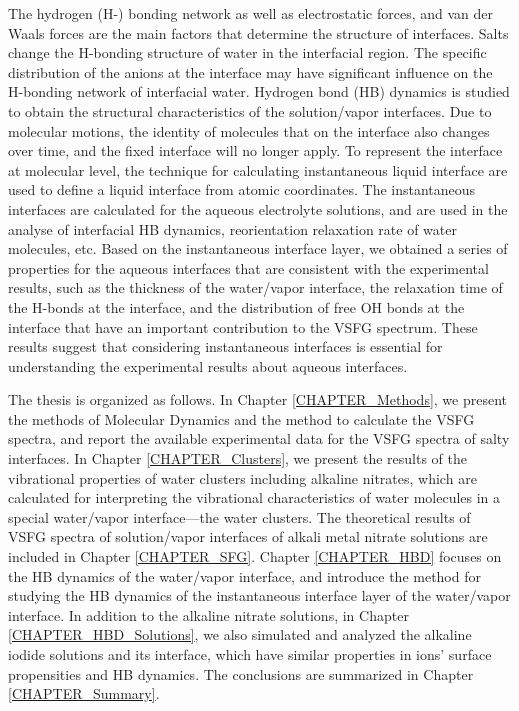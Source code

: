 %
The hydrogen (H-) bonding network \cite{Eisenberg1969,Speedy1976,Poole1994,Soper2008b,Nilsson2011,Ball2001,Pettersson2015} as well as electrostatic forces, 
and van der Waals forces are the main factors that determine the structure of interfaces. 
Salts change the H-bonding structure of water in the interfacial region\cite{EAR04,McLain2006,Ball2008}. 
The specific distribution of the anions at the interface may have significant influence on the H-bonding network of interfacial water\cite{Morita2008}.
Hydrogen bond (HB) dynamics is studied to obtain the structural characteristics of the solution/vapor interfaces.
Due to molecular motions, the identity of molecules that on the interface also changes over time\cite{Willard2010}, and the fixed interface will no longer apply. 
To represent the interface at molecular level, the technique for calculating instantaneous liquid interface are used to define a liquid interface from atomic coordinates.
The instantaneous interfaces are calculated for the aqueous electrolyte solutions, and are used in the analyse of interfacial HB dynamics, 
reorientation relaxation rate of water molecules, etc.
Based on the instantaneous interface layer, we obtained a series of properties for the aqueous interfaces that are consistent with the experimental results, 
such as the thickness of the water/vapor interface, the relaxation time of the H-bonds at the interface, 
and the distribution of free OH bonds at the interface that have an important contribution to the VSFG spectrum.
These results suggest that considering instantaneous interfaces is essential for understanding the experimental results about aqueous interfaces.
%

The thesis is organized as follows. 
In Chapter \ref{CHAPTER_Methods}, we present the methods of \abinitio Molecular Dynamics
and the method to calculate the VSFG spectra,
and report the available experimental data for the VSFG spectra of salty interfaces.
In Chapter \ref{CHAPTER_Clusters}, we present the results of the vibrational properties of water clusters including alkaline nitrates, 
which are calculated for interpreting the vibrational characteristics of water molecules in a special water/vapor interface---the water clusters.
The theoretical results of VSFG spectra of solution/vapor interfaces of alkali metal nitrate solutions are included in Chapter \ref{CHAPTER_SFG}. 
Chapter \ref{CHAPTER_HBD} focuses on the HB dynamics of the water/vapor interface, 
and introduce the method for studying the HB dynamics of the instantaneous interface layer of the water/vapor interface.
In addition to the alkaline nitrate solutions, in Chapter \ref{CHAPTER_HBD_Solutions}, we also simulated and analyzed the alkaline iodide solutions and its interface, which have similar properties in ions' surface propensities and HB dynamics. 
The conclusions are summarized in Chapter \ref{CHAPTER_Summary}.
